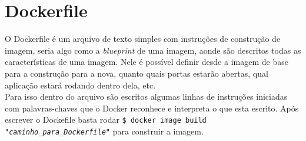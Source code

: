 \documentclass[twocolumn, letterpaper]{scrartcl}
\begin{document}
\section*{\color{triton_blue}Dockerfile}
O Dockerfile é um arquivo de texto simples com instruções de construção de imagem, seria algo como a \textit{blueprint} de uma imagem, aonde são descritos todas as características de uma imagem. Nele é possível definir desde a imagem de base para a construção para a nova, quanto quais portas estarão abertas, qual aplicação estará rodando dentro dela, etc.\\
Para isso dentro do arquivo são escritos algumas linhas de instruções iniciadas com palavras-chaves que o Docker reconhece e interpreta o que esta escrito. Após escrever o Dockefile basta rodar \texttt{\$ docker image build \textit{"caminho\_para\_Dockerfile"}} para construir a imagem.\\
\indent{}
\end{document}
